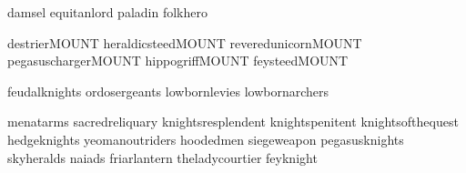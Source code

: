 

{damsel}
{equitanlord}
{paladin}
{folkhero}

\clearpage
{}
{destrierMOUNT}
{heraldicsteedMOUNT}
{reveredunicornMOUNT}
{pegasuschargerMOUNT}
{hippogriffMOUNT}
{feysteedMOUNT}

\clearpage
{}

{feudalknights}
{ordosergeants}
{lowbornlevies}
{lowbornarchers}

\clearpage
{}

{menatarms}
{sacredreliquary}
{knightsresplendent}
{knightspenitent}
{knightsofthequest}
{hedgeknights}
{yeomanoutriders}
{hoodedmen}
{siegeweapon}
{pegasusknights}
{skyheralds}
\clearpage
{}
{naiads}
{friarlantern}
{theladycourtier}
{feyknight}

